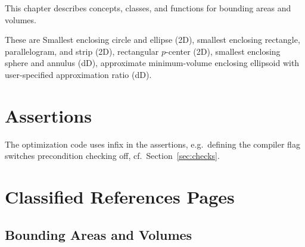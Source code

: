 





This chapter describes concepts, classes, and functions for bounding areas and volumes.

These are Smallest enclosing circle and ellipse (2D), smallest enclosing rectangle,
parallelogram, and strip (2D), rectangular $p$-center (2D), smallest
enclosing sphere and annulus (dD), approximate
minimum-volume enclosing ellipsoid with user-specified
approximation ratio (dD).

\section*{Assertions}
The optimization code uses infix  in the assertions,
e.g.\ defining the compiler flag
 switches precondition
checking off, cf.~Section~\ref{sec:checks}.

\section{Classified References Pages}

\subsection*{Bounding Areas and Volumes}

\\[1ex]
\\[1ex]

\smallskip

\\[1ex]
\\[1ex]

\smallskip

